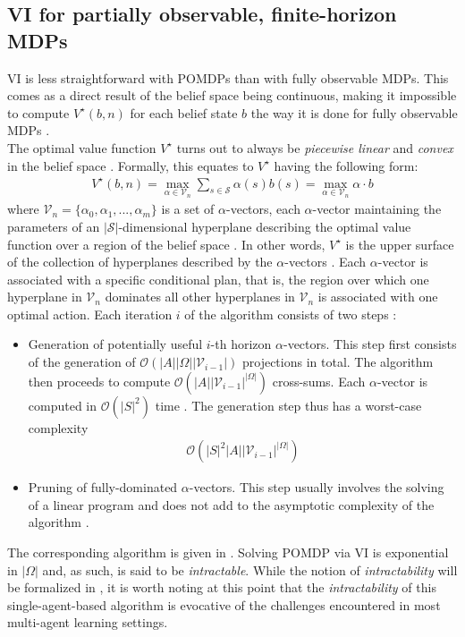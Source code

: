 \subsection{VI for partially observable, finite-horizon MDPs}
VI is less straightforward with POMDPs than with fully observable MDPs. This comes as a direct result of the belief space being continuous, making it impossible to compute $V^{\star}(b,n)$ for each belief state $b$ the way it is done for fully observable MDPs \cite{Russell:2009:AIM:1671238}. \\ The optimal value function $V^{\star}$ turns out to always be \textit{piecewise linear} and \textit{convex} in the belief space \cite{RePEc:inm:oropre:v:21:y:1973:i:5:p:1071-1088}. Formally, this equates to $V^{\star}$ having the following form:
\begin{align}
    V^{\star}(b, n) = \max_{\alpha \in \mathcal{V}_n} \sum_{s \in \mathcal{S}}\alpha(s) b(s) = \max_{\alpha \in \mathcal{V}_n} \alpha \cdot b
\end{align}
where $\mathcal{V}_n = \{\alpha_0,\alpha_1,...,\alpha_m \}$ is a set of $\alpha$-vectors, each $\alpha$-vector maintaining the parameters of an $|\mathcal{S}|$-dimensional hyperplane describing the optimal value function over a region of the belief space \cite{Pineau-2003-8730}. In other words, $V^{\star}$ is the upper surface of the collection of hyperplanes described by the $\alpha$-vectors \cite{uppersurface}. Each $\alpha$-vector is associated with a specific conditional plan, that is, the region over which one hyperplane in $\mathcal{V}_n$ dominates all other hyperplanes in $\mathcal{V}_n$ is associated with one optimal action. Each iteration $i$ of the algorithm  consists of two steps \cite{phdthesispomdp}:
\begin{itemize}
    \item Generation of potentially useful $i$-th horizon $\alpha$-vectors. This step first consists of the generation of $\mathcal{O}(|A||\Omega||\mathcal{V}_{i-1}|)$  projections in total. The algorithm then proceeds to compute $\mathcal{O}(|A||\mathcal{V}_{i-1}|^{|\Omega|})$ cross-sums. Each $\alpha$-vector is computed in $\mathcal{O}(|S|^2)$ time \cite{Pineau-2003-8730,hauskrecht,crosssum}. The generation step thus has a worst-case complexity 
    \begin{align}
        \mathcal{O}(|S|^2|A||\mathcal{V}_{i-1}|^{|\Omega|})
    \end{align}
    \item Pruning of fully-dominated $\alpha$-vectors. This step usually involves the solving of a linear program and does not add to the asymptotic complexity of the algorithm \cite{KAELBLING199899}.
\end{itemize}
The corresponding algorithm is given in . Solving POMDP via VI is exponential in $|\Omega|$ and, as such, is said to be \textit{intractable}. While the notion of \textit{intractability} will be formalized in , it is worth noting at this point that the \textit{intractability} of this single-agent-based algorithm is evocative of the challenges encountered in most multi-agent learning settings.

